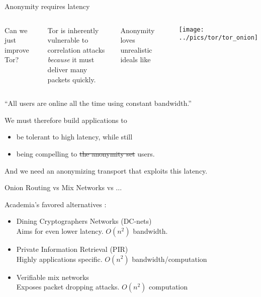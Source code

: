 \documentclass[fleqn,xcolor={usenames,dvipsnames}]{beamer}
\begin{document}


\begin{frame}[t]{Anonymity requires latency}
\begin{columns}[T]
\hspace*{20pt} Can we just improve Tor?

\medskip

\hspace*{5pt} Tor is inherently vulnerable to correlation attacks \\
 \hspace*{10pt} {\em because} it must deliver many packets quickly.

\bigskip 

\hspace*{5pt} Anonymity loves unrealistic ideals like

\texttt{[image: ../pics/tor/tor\_onion]}
\end{columns}
\smallskip
\hspace*{1pt} ``All users are online all the time using constant bandwidth.''

\bigskip
\pause

\noindent We must therefore build applications to
\begin{itemize}
\item be tolerant to high latency, while still
\item being compelling to \sout{the anonymity set} users.
\end{itemize}

\smallskip

And we need an anonymizing transport that exploits this latency.

\end{frame}


\begin{frame}[t]{Onion Routing vs Mix Networks vs ...}

Academia's favored alternatives :
\begin{itemize}
\item Dining Cryptographers Networks (DC-nets) \\
 \hspace*{2pt} Aims for even lower latency. $O(n^2)$ bandwidth. 
\item Private Information Retrieval (PIR) \\
 \hspace*{2pt} Highly applications specific.  $O(n^2)$ bandwidth/computation
\item Verifiable mix networks \\
 \hspace*{2pt} Exposes packet dropping attacks. $O(n^2)$ computation
\end{itemize}

\end{frame}
\end{document}
